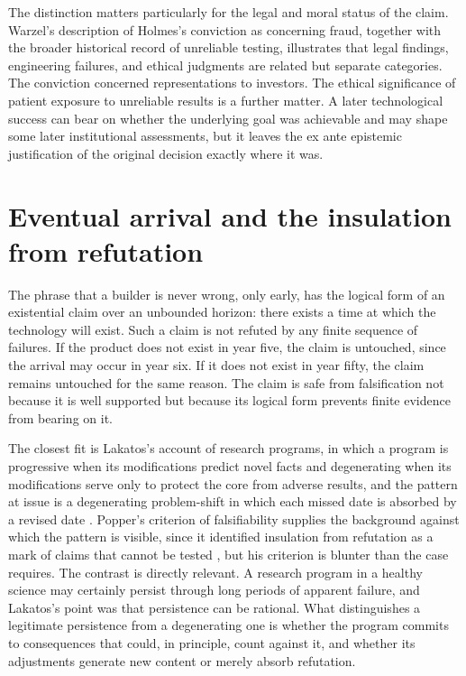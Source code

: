 \documentclass[11pt]{article}
\theoremstyle{plain}
\theoremstyle{definition}
\theoremstyle{remark}
\begin{document}
The distinction matters particularly for the legal and moral status of the claim. Warzel's description of Holmes's conviction as concerning fraud, together with the broader historical record of unreliable testing, illustrates that legal findings, engineering failures, and ethical judgments are related but separate categories. The conviction concerned representations to investors. The ethical significance of patient exposure to unreliable results is a further matter. A later technological success can bear on whether the underlying goal was achievable and may shape some later institutional assessments, but it leaves the ex ante epistemic justification of the original decision exactly where it was.

\section{Eventual arrival and the insulation from refutation}

The phrase that a builder is never wrong, only early, has the logical form of an existential claim over an unbounded horizon: there exists a time at which the technology will exist. Such a claim is not refuted by any finite sequence of failures. If the product does not exist in year five, the claim is untouched, since the arrival may occur in year six. If it does not exist in year fifty, the claim remains untouched for the same reason. The claim is safe from falsification not because it is well supported but because its logical form prevents finite evidence from bearing on it.

The closest fit is Lakatos's account of research programs, in which a program is progressive when its modifications predict novel facts and degenerating when its modifications serve only to protect the core from adverse results, and the pattern at issue is a degenerating problem-shift in which each missed date is absorbed by a revised date \citep{lakatos1970}. Popper's criterion of falsifiability supplies the background against which the pattern is visible, since it identified insulation from refutation as a mark of claims that cannot be tested \citep{popper1959}, but his criterion is blunter than the case requires. The contrast is directly relevant. A research program in a healthy science may certainly persist through long periods of apparent failure, and Lakatos's point was that persistence can be rational. What distinguishes a legitimate persistence from a degenerating one is whether the program commits to consequences that could, in principle, count against it, and whether its adjustments generate new content or merely absorb refutation.
\end{document}
